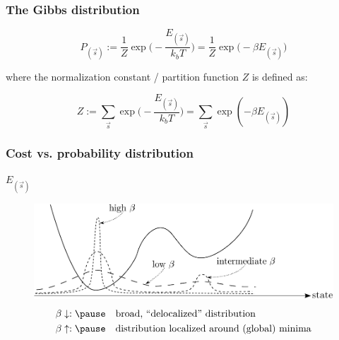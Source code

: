 \begin{frame}\frametitle{The Gibbs distribution}
\begin{equation}  \label{eq:gibbs}
P_{(\vec{s})} := \frac{1}{Z} \exp \Big(-\frac{E_{(\vec s)}}{k_b T}\Big) 
= \frac{1}{Z} \exp \Big(-\beta E_{(\vec s)} \Big) 
\end{equation}

where the normalization constant / partition function $Z$ is defined as:


\begin{equation} \label{eq:partition}
Z := \sum\limits_{\vec{s}} \exp \Big(-\frac{E_{(\vec s)}}{k_b T}\Big) = \sum\limits_{\vec{s}} \exp(-\beta E_{(\vec s)})
\end{equation}


\end{frame}

\begin{frame}\frametitle{Cost vs. probability distribution}

$E_{(\vec{s})}$
\vspace{-0.2cm}
\begin{figure}[h]
  \centering
\includegraphics[width=12cm]{img/section3_fig7}  
\[ \begin{array}{ll}
	\beta \downarrow:\pause
	& \text{broad, ``delocalized'' distribution} \\\vspace{-0.3cm}\\
	\beta \uparrow:\pause
	& \text{distribution localized around (global) minima}
\end{array} \]
\end{figure}


\end{frame}

